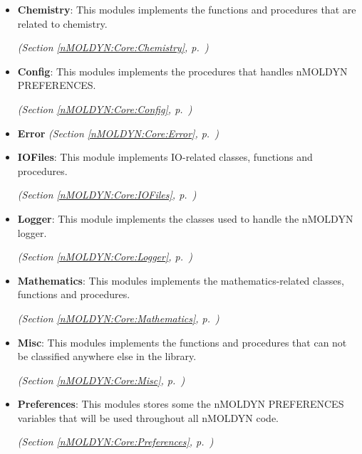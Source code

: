 \begin{itemize}
\setlength{\parskip}{0ex}
\item \textbf{Chemistry}: This modules implements the functions and procedures that are related to chemistry.



  \textit{(Section \ref{nMOLDYN:Core:Chemistry}, p.~\pageref{nMOLDYN:Core:Chemistry})}

\item \textbf{Config}: 
This modules implements the procedures that handles nMOLDYN PREFERENCES.



  \textit{(Section \ref{nMOLDYN:Core:Config}, p.~\pageref{nMOLDYN:Core:Config})}

\item \textbf{Error}
  \textit{(Section \ref{nMOLDYN:Core:Error}, p.~\pageref{nMOLDYN:Core:Error})}

\item \textbf{IOFiles}: This module implements IO-related classes, functions and procedures.



  \textit{(Section \ref{nMOLDYN:Core:IOFiles}, p.~\pageref{nMOLDYN:Core:IOFiles})}

\item \textbf{Logger}: This module implements the classes used to handle the nMOLDYN logger.



  \textit{(Section \ref{nMOLDYN:Core:Logger}, p.~\pageref{nMOLDYN:Core:Logger})}

\item \textbf{Mathematics}: This modules implements the mathematics-related classes, functions and procedures.



  \textit{(Section \ref{nMOLDYN:Core:Mathematics}, p.~\pageref{nMOLDYN:Core:Mathematics})}

\item \textbf{Misc}: This modules implements the functions and procedures that can not be classified anywhere else in 
the library.



  \textit{(Section \ref{nMOLDYN:Core:Misc}, p.~\pageref{nMOLDYN:Core:Misc})}

\item \textbf{Preferences}: This modules stores some the nMOLDYN PREFERENCES variables that will be 
used throughout all nMOLDYN code.



  \textit{(Section \ref{nMOLDYN:Core:Preferences}, p.~\pageref{nMOLDYN:Core:Preferences})}

\end{itemize}

